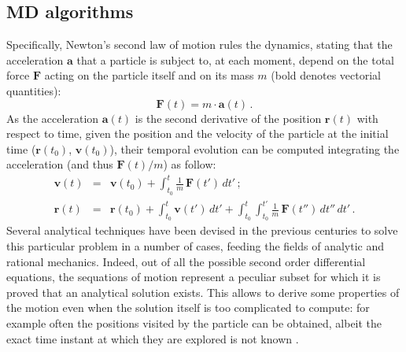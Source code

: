 \subsection{MD algorithms}
Specifically, Newton's second law of motion rules the dynamics, stating that the acceleration $\textbf{a}$ that a particle is subject to, at each moment, depend on the total force $\textbf{F}$ acting on the particle itself and on its mass $m$ (bold denotes vectorial quantities):
\begin{equation}
\textbf{F}(t) =  m \cdot \textbf{a}(t) \, .
\end{equation}
As the acceleration $\textbf{a}(t)$ is the second derivative of the position $\textbf{r}(t)$ with respect to time, given the position and the velocity of the particle at the initial time ($\textbf{r}(t_0)$, $\textbf{v}(t_0)$), their temporal evolution can be computed integrating the acceleration (and thus $\textbf{F}(t)/m$) as follow:
\begin{eqnarray} \label{eq:analytical}
\mathbf{v}(t) &=& \mathbf{v}(t_0) + \int_{t_0}^t \frac{1}{m}\,\mathbf{F}(t') \, dt' \, ; \\
\mathbf{r}(t) &=& \mathbf{r}(t_0) + \int_{t_0}^t \mathbf{v}(t') \, dt' + \int_{t_0}^t \int_{t_0}^{t'} \frac{1}{m}\,\mathbf{F}(t'') \, dt'' \, dt'\, .
\end{eqnarray}
Several analytical techniques have been devised in the previous centuries to solve this particular problem in a number of cases, feeding the fields of analytic and rational mechanics. Indeed, out of all the possible second order differential equations, the sequations of motion represent a peculiar subset for which it is proved that an analytical solution exists. This allows to derive some properties of the motion even when the solution itself is too complicated to compute: for example often the positions visited by the particle can be obtained, albeit the exact time instant at which they are explored is not known \cite{Arnold}.

